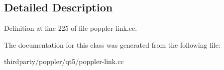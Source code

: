 \subsection{Detailed Description}


Definition at line 225 of file poppler-\/link.\+cc.



The documentation for this class was generated from the following file\+:\begin{DoxyCompactItemize}
\item 
thirdparty/poppler/qt5/poppler-\/link.\+cc\end{DoxyCompactItemize}
